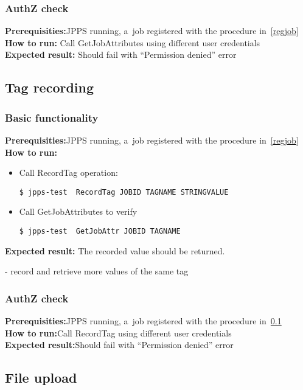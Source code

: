 \documentclass{egee}
\def\req{\noindent\textbf{Prerequisities:}}
\def\how{\noindent\textbf{How to run:}}
\def\result{\noindent\textbf{Expected result:}}
\begin{document}
\subsubsection{AuthZ check}
\req JPPS running, a~job registered with the procedure in~\ref{regjob} \\
\how
Call GetJobAttributes using different user credentials \\
\result 
Should fail with ``Permission denied'' error \\


\subsection{Tag recording}
\label{tagreg}

\subsubsection{Basic functionality}
\req JPPS running, a~job registered with the procedure in~\ref{regjob}
\how 
\begin{itemize}
\item Call RecordTag operation:
\begin{verbatim}
$ jpps-test  RecordTag JOBID TAGNAME STRINGVALUE
\end{verbatim}
\item Call GetJobAttributes to verify
\begin{verbatim}
$ jpps-test  GetJobAttr JOBID TAGNAME
\end{verbatim}
\end{itemize}
\result
The recorded value should be returned.

- record and retrieve more values of the same tag

\subsubsection{AuthZ check}
\req JPPS running, a~job registered with the procedure in~\ref{tagreg} \\
\how Call RecordTag using different user credentials \\
\result Should fail with ``Permission denied'' error \\



\subsection{File upload}
\end{document}
